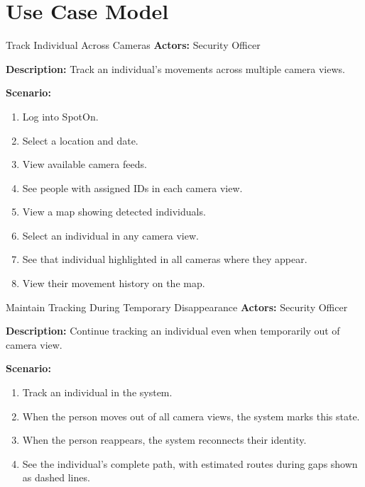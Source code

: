 \section{Use Case Model}
\label{section:use-case-model}

\begin{usecase}{Track Individual Across Cameras}
    \textbf{Actors:} Security Officer
    
    \textbf{Description:} Track an individual's movements across multiple camera views.
    
    \textbf{Scenario:}
    \begin{enumerate}[leftmargin=80pt]
        \item Log into SpotOn.
        \item Select a location and date.
        \item View available camera feeds.
        \item See people with assigned IDs in each camera view.
        \item View a map showing detected individuals.
        \item Select an individual in any camera view.
        \item See that individual highlighted in all cameras where they appear.
        \item View their movement history on the map.
    \end{enumerate}
\end{usecase}

\begin{usecase}{Maintain Tracking During Temporary Disappearance}
    \textbf{Actors:} Security Officer
    
    \textbf{Description:} Continue tracking an individual even when temporarily out of camera view.
    
    \textbf{Scenario:}
    \begin{enumerate}[leftmargin=80pt]
        \item Track an individual in the system.
        \item When the person moves out of all camera views, the system marks this state.
        \item When the person reappears, the system reconnects their identity.
        \item See the individual's complete path, with estimated routes during gaps shown as dashed lines.
    \end{enumerate}
\end{usecase}

